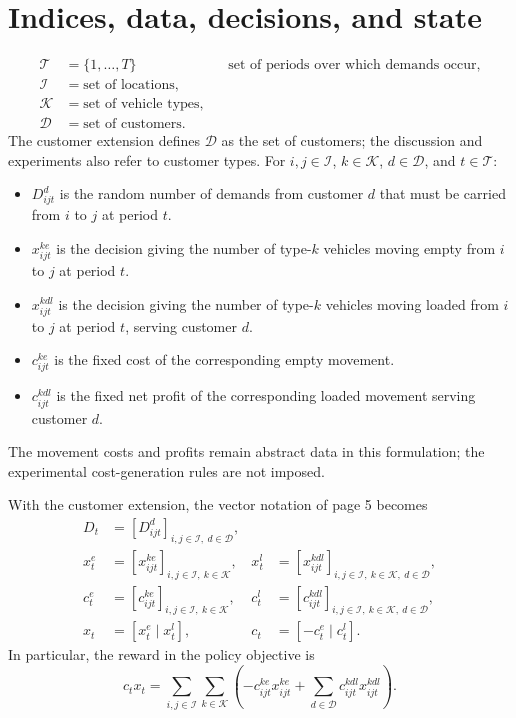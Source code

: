 \documentclass{article}
\begin{document}
\section*{Indices, data, decisions, and state}
\[
\begin{aligned}
\mathcal{T}&=\{1,\ldots,T\}&&\text{set of periods over which demands occur},\\
\mathcal{I}&=\text{set of locations},\\
\mathcal{K}&=\text{set of vehicle types},\\
\mathcal{D}&=\text{set of customers}.
\end{aligned}
\]
The customer extension defines \(\mathcal{D}\) as the set of customers; the discussion and experiments also refer to customer types. For \(i,j\in\mathcal{I}\), \(k\in\mathcal{K}\), \(d\in\mathcal{D}\), and \(t\in\mathcal{T}\):
\begin{itemize}
\item \(D_{ijt}^{d}\) is the random number of demands from customer \(d\) that must be carried from \(i\) to \(j\) at period \(t\).
\item \(x_{ijt}^{ke}\) is the decision giving the number of type-\(k\) vehicles moving empty from \(i\) to \(j\) at period \(t\).
\item \(x_{ijt}^{kdl}\) is the decision giving the number of type-\(k\) vehicles moving loaded from \(i\) to \(j\) at period \(t\), serving customer \(d\).
\item \(c_{ijt}^{ke}\) is the fixed cost of the corresponding empty movement.
\item \(c_{ijt}^{kdl}\) is the fixed net profit of the corresponding loaded movement serving customer \(d\).
\end{itemize}
The movement costs and profits remain abstract data in this formulation; the experimental cost-generation rules are not imposed.

With the customer extension, the vector notation of page 5 becomes
\[
\begin{aligned}
D_t&=[D_{ijt}^{d}]_{i,j\in\mathcal{I},\ d\in\mathcal{D}},\\
x_t^e&=[x_{ijt}^{ke}]_{i,j\in\mathcal{I},\ k\in\mathcal{K}},&
x_t^l&=[x_{ijt}^{kdl}]_{i,j\in\mathcal{I},\ k\in\mathcal{K},\ d\in\mathcal{D}},\\
c_t^e&=[c_{ijt}^{ke}]_{i,j\in\mathcal{I},\ k\in\mathcal{K}},&
c_t^l&=[c_{ijt}^{kdl}]_{i,j\in\mathcal{I},\ k\in\mathcal{K},\ d\in\mathcal{D}},\\
x_t&=[x_t^e\mid x_t^l],&c_t&=[-c_t^e\mid c_t^l].
\end{aligned}
\]
In particular, the reward in the policy objective is
\[
c_tx_t=\sum_{i,j\in\mathcal{I}}\sum_{k\in\mathcal{K}}
\left(-c_{ijt}^{ke}x_{ijt}^{ke}+\sum_{d\in\mathcal{D}}c_{ijt}^{kdl}x_{ijt}^{kdl}\right).
\]
\end{document}
